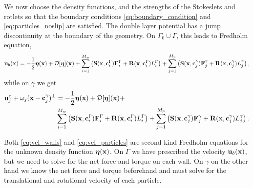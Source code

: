 \documentclass[preprint, 10pt]{elsarticle}
\begin{document}
We now choose the density functions, and the strengths of the Stokeslets
and rotlets so that the boundary
conditions \eqref{eq:boundary_condition} and \eqref{eq:particles_noslip} are satisfied.  
The double layer potential has a jump discontinuity at the boundary of
the geometry. On $\Gamma_0\cup\Gamma$, this leads to
Fredholm equation,
\begin{equation}
  \label{eq:vel_walls} 
  \begin{aligned}
 {\mathbf{u}}_b({\mathbf{x}}) = -\frac{1}{2}{\boldsymbol\eta}({\mathbf{x}}) + {\mathcal{D}}[{\boldsymbol\eta}]({\mathbf{x}}) + 
             \sum_{i=1}^{M_w} \left(\mathbf{S}({\mathbf{x}},{\mathbf{c}}^\Gamma_i){\mathbf{F}}^\Gamma_i + 
                \mathbf{R}({\mathbf{x}},{\mathbf{c}}^\Gamma_i)L^\Gamma_i\right) + \sum_{j=1}^{M_p} \left(\mathbf{S}({\mathbf{x}},{\mathbf{c}}^\gamma_j){\mathbf{F}}^\gamma_j + 
                \mathbf{R}({\mathbf{x}},{\mathbf{c}}^\gamma_j)L^\gamma_j\right),  
  \end{aligned}
\end{equation}
while on $\gamma$ we get
\begin{equation}  \label{eq:vel_particles} 
\begin{aligned}
  {\mathbf{u}}^\tau_j + \omega_j({\mathbf{x}}-{\mathbf{c}}^\gamma_j)^\perp &= -\frac{1}{2}{\boldsymbol\eta}({\mathbf{x}}) + {\mathcal{D}}[{\boldsymbol\eta}]({\mathbf{x}}) + \\&
             \sum_{i=1}^{M_w} \left(\mathbf{S}({\mathbf{x}},{\mathbf{c}}^\Gamma_i){\mathbf{F}}^\Gamma_i + 
                \mathbf{R}({\mathbf{x}},{\mathbf{c}}^\Gamma_i)L^\Gamma_i\right) + \sum_{j=1}^{M_p} \left(\mathbf{S}({\mathbf{x}},{\mathbf{c}}^\gamma_j){\mathbf{F}}^\gamma_j + 
                \mathbf{R}({\mathbf{x}},{\mathbf{c}}^\gamma_j)L^\gamma_j\right).
 \end{aligned}
\end{equation}         

Both \eqref{eq:vel_walls} and \eqref{eq:vel_particles} are second kind Fredholm equations for the unknown density function ${\boldsymbol\eta}({\mathbf{x}})$. On $\Gamma$ we have prescribed the velocity ${\mathbf{u}}_b({\mathbf{x}})$, but we need to solve for the net force and torque on each wall. On $\gamma$ on the other hand we know the net force and torque beforehand and must solve for the translational and rotational velocity of each particle. 
\end{document}
